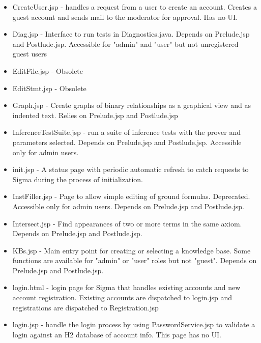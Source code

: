 \documentclass{book}
\begin{document}
\begin{itemize}
\item CreateUser.jsp - handles a request from a user to create an account.  Creates a guest account
and sends mail to the moderator for approval.  Has no UI.

\item Diag.jsp - Interface to run tests in Diagnostics.java.  Depends on Prelude.jsp and Postlude.jsp.
Accessible for "admin" and "user" but not unregistered guest users

\item EditFile.jsp - Obsolete

\item EditStmt.jsp - Obsolete

\item Graph.jsp - Create graphs of binary relationships as a graphical view and as indented text.
Relies on Prelude.jsp and Postlude.jsp

\item InferenceTestSuite.jsp - run a suite of inference tests with the prover and parameters selected.
Depends on Prelude.jsp and Postlude.jsp.  Accessible only for admin users.

\item init.jsp - A status page with periodic automatic refresh to catch requests to Sigma during the
process of initialization.

\item InstFiller.jsp - Page to allow simple editing of ground formulas.  Deprecated.  Accessible only
for admin users. Depends on Prelude.jsp and Postlude.jsp.

\item Intersect.jsp - Find appearances of two or more terms in the same axiom.  Depends on
Prelude.jsp and Postlude.jsp.

\item KBs.jsp - Main entry point for creating or selecting a knowledge base.  Some functions are
available for "admin" or "user" roles but not "guest". Depends on Prelude.jsp and Postlude.jsp.

\item login.html - login page for Sigma that handles existing accounts and new account registration.
Existing accounts are dispatched to login.jsp and registrations are dispatched to
Registration.jsp

\item login.jsp - handle the login process by using PasswordService.jsp to validate a login against
an H2 database of account info.  This page has no UI.


\end{itemize}
\end{document}
